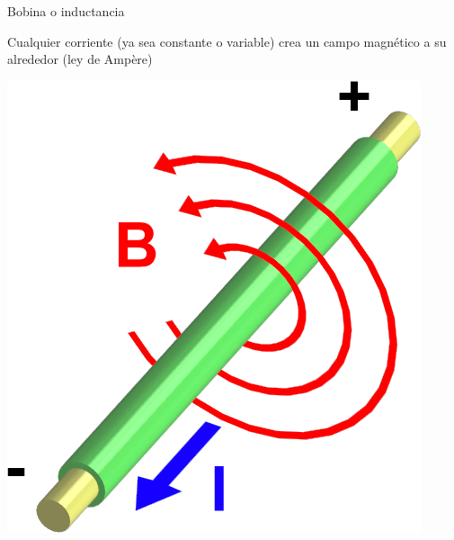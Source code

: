 \documentclass[aspectratio=169, xcolor={usenames,svgnames,dvipsnames}]{beamer}
\begin{document}




\begin{frame}{Bobina o inductancia} \label{diapo:bobina_inicio}
    \begin{minipage}[c]{0.47\linewidth}     

        \vspace{5mm}
        Cualquier \alert{corriente} (ya sea constante o variable) \alert{crea un campo magnético} a su alrededor (ley de Ampère)
        
        \vspace{3mm}
        
        \begin{center}
            \includegraphics[height=0.5\textheight]{../figs/Electromagnetism.png}
        \end{center}
    \end{minipage}
    \hfill%
    \begin{minipage}[c]{0.47\linewidth}
    

\end{minipage}
\end{frame}
\end{document}
